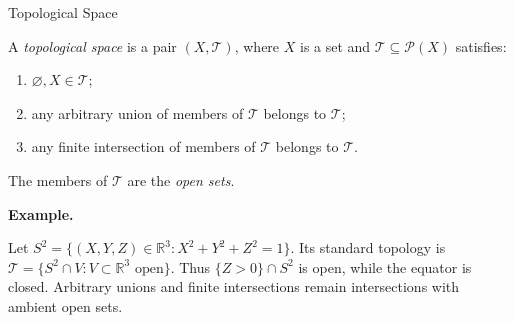 \documentclass[11pt]{article}
\makeatletter
\newcommand{\R}{\mathbb R}
\newcounter{definition}
\newcommand{\exampleheading}{\par\medskip\textbf{Example.}\par\smallskip}
\newcommand{\currentdefinition}[1]{\protected@edef\@currentlabel{#1}}
\makeatother
\begin{document}
\begin{definitionbox}{Topological Space}
\currentdefinition{\thedefinition}
\label{source:S01}
\label{def:01-01}

A \emph{topological space} is a pair $(X,\mathcal T)$, where $X$ is a set
and $\mathcal T\subseteq\mathcal P(X)$ satisfies:

\begin{enumerate}[label=(\alph*),leftmargin=*,itemsep=.35em]

\item $\varnothing,X\in\mathcal T$;

\item any arbitrary union of members of $\mathcal T$ belongs to $\mathcal T$;

\item any finite intersection of members of $\mathcal T$ belongs to $\mathcal T$.

\end{enumerate}

The members of $\mathcal T$ are the \emph{open sets}.


\exampleheading
Let $S^2=\{(X,Y,Z)\in\R^3:X^2+Y^2+Z^2=1\}$. Its standard topology is $\mathcal T=\{S^2\cap V:V\subset\R^3\text{ open}\}$. Thus $\{Z>0\}\cap S^2$ is open, while the equator is closed. Arbitrary unions and finite intersections remain intersections with ambient open sets.
\end{definitionbox}
\end{document}
